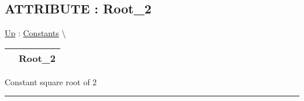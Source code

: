 \subsection*{ATTRIBUTE : Root\_2}
\hypertarget{ecldoc:ml_core.constants.root_2}{}
\hyperlink{ecldoc:ML_Core.Constants}{Up} :
\hspace{0pt} \hyperlink{ecldoc:ML_Core.Constants}{Constants} \textbackslash 

{\renewcommand{\arraystretch}{1.5}
\begin{tabularx}{\textwidth}{|>{\raggedright\arraybackslash}l|X|}
\hline
\hspace{0pt} & Root\_2 \\
\hline
\end{tabularx}
}

\par
Constant square root of 2


\rule{\linewidth}{0.5pt}


